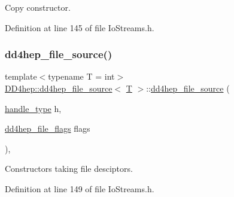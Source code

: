 Copy constructor. 



Definition at line 145 of file Io\+Streams.\+h.

\hypertarget{class_d_d4hep_1_1dd4hep__file__source_a66badf1d47206c7d61e0e036e910999e}{}\label{class_d_d4hep_1_1dd4hep__file__source_a66badf1d47206c7d61e0e036e910999e} 
\subsubsection{\texorpdfstring{dd4hep\+\_\+file\+\_\+source()}{dd4hep\_file\_source()}\hspace{0.1cm}{\footnotesize\ttfamily [3/4]}}
{\footnotesize\ttfamily template$<$typename T = int$>$ \\
\hyperlink{class_d_d4hep_1_1dd4hep__file__source}{D\+D4hep\+::dd4hep\+\_\+file\+\_\+source}$<$ \hyperlink{class_t}{T} $>$\+::\hyperlink{class_d_d4hep_1_1dd4hep__file__source}{dd4hep\+\_\+file\+\_\+source} (\begin{DoxyParamCaption}\item[{\hyperlink{class_d_d4hep_1_1dd4hep__file_a4d79f8d433cd7831ff818691424cd6fc}{handle\+\_\+type}}]{h,  }\item[{\hyperlink{namespace_d_d4hep_a31d19f9b0ce567067d2897fbda1761e5}{dd4hep\+\_\+file\+\_\+flags}}]{flags }\end{DoxyParamCaption})\hspace{0.3cm}{\ttfamily [inline]}, {\ttfamily [explicit]}}



Constructors taking file desciptors. 



Definition at line 149 of file Io\+Streams.\+h.

\hypertarget{class_d_d4hep_1_1dd4hep__file__source_a84e465929a469a23c8347adf98f68afe}{}\label{class_d_d4hep_1_1dd4hep__file__source_a84e465929a469a23c8347adf98f68afe} 
